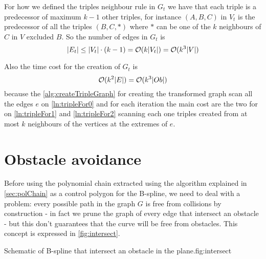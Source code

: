 \documentclass[dissertation.tex]{subfiles}
\begin{document}
For how we defined the triples neighbour rule in $G_t$ we have
that each triple is a predecessor of maximum $k-1$ other triples, for
instance $(A,B,C)$ in $V_t$ is the predecessor of all the triples
$(B,C,*)$ where $*$ can be one of the $k$ neighbours
of $C$ in $V$ excluded $B$. So the number of edges in $G_t$ is
\begin{equation}
  \label{eq:numEdgesTriples}
  |E_t|\leq |V_t|\cdot (k-1)=\mathcal{O}(k|V_t|)=\mathcal{O}(k^3|V|)
\end{equation}

Also the time cost for the creation of $G_t$ is
\newcommand{\eqCostVt}{\ensuremath{\bigO(k^3|Ob|)}}
\begin{equation}
  \label{eq:costVt}
  \bigO(k^2|E|)=\eqCostVt
\end{equation}
because the \cref{alg:createTripleGraph} for creating the transformed
graph scan all the edges $e$ on \cref{ln:tripleFor0} and for each
iteration
the main cost are the two for on \cref{ln:tripleFor1} and
\cref{ln:tripleFor2} scanning each one triples created from at most
$k$ neighbours
of the vertices at the extremes of $e$.

\section{Obstacle avoidance}\label{sec:obsAvoid}
Before using the polynomial chain extracted using the algorithm
explained in \cref{sec:polChain} as a control polygon for the
B-spline, we need to deal with a
problem: every possible path in the graph $G$ is
free from collisions by construction - in fact we prune the graph of
every edge that intersect an obstacle - but this don't guarantees that
the curve will be free from obstacles. This concept is expressed in \cref{fig:intersect}.
\begin{myfig}{Schematic of B-spline that intersect an obstacle in the plane.}{fig:intersect}
\end{myfig}
\end{document}
